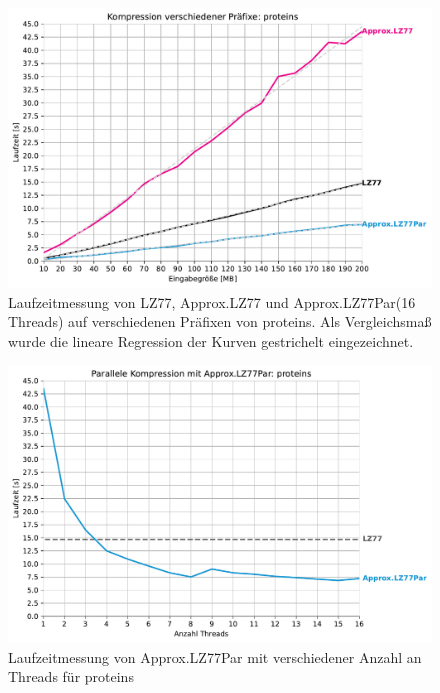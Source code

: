\begin{figure}[ht]
    \centering
    \caption{Laufzeitmessung von LZ77, Approx.LZ77 und Approx.LZ77Par(16 Threads) auf verschiedenen Präfixen von proteins. Als Vergleichsmaß wurde 
    die lineare Regression der Kurven gestrichelt eingezeichnet.}
    \label{runtime}
    \includegraphics[scale=0.6]{Images/progressive_proteins.pdf}
\end{figure}
    
\begin{figure}[ht]
    \centering
    \caption{Laufzeitmessung von Approx.LZ77Par mit verschiedener Anzahl an Threads für proteins}
    \label{runtime_threads}
    \includegraphics[scale=0.6]{Images/progressive_speedup_proteins.pdf}
\end{figure}

